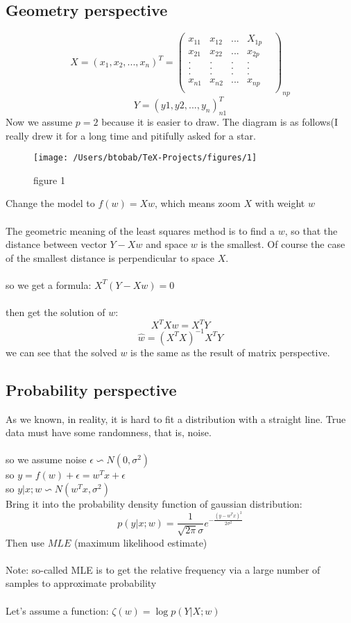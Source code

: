 \documentclass{report}
\begin{document}
\subsection{Geometry perspective}
$$
X=(x_1,x_2,...,x_n)^T=\begin{pmatrix}
x_{11}&x_{12}&...&X_{1p}\\
x_{21}&x_{22}&...&x_{2p}\\
.&.&.&.&\\
.&.&.&.&\\
.&.&.&.&\\
x_{n1}&x_{n2}&...&x_{np}\\
\end{pmatrix}_{np}
$$
$$
Y=(y1,y2,...,y_n)_{n1}^T
$$
Now we assume  $p=2$ because it is easier to draw. The diagram is as follows(I really drew it for a long time and pitifully asked for a star.
\begin{figure}
\texttt{[image: /Users/btobab/TeX-Projects/figures/1]}
\caption{figure 1}
\end{figure}
Change the model to $f(w)=Xw$, which means zoom $X$ with weight $w$\\\\
The geometric meaning of the least squares method is to find a $w$, so that the distance between vector $Y-Xw$ and space $w$ is the smallest. Of course the case of the smallest distance is perpendicular to space $X$.\\\\
so we get a formula: $X^T(Y-Xw)=0$\\\\
then get the solution of $w$: 
$$
X^TXw=X^TY
$$
$$
\hat{w}=(X^TX)^{-1}X^TY
$$
we can see that the solved $w$ is the same as the result of matrix perspective.
\subsection{Probability perspective}
As we known, in reality, it is hard to fit a distribution with a straight line. True data must have some randomness, that is, noise.\\\\
so we assume noise $\epsilon\backsim N(0,\sigma^2)$\\
so $y=f(w)+\epsilon=w^Tx+\epsilon$\\
so $y|x;w\backsim N(w^Tx,\sigma^2)$\\
Bring it into the probability density function of gaussian distribution:
$$
p(y|x;w)=\frac{1}{\sqrt{2\pi}\sigma}e^{-\frac{(y-w^Tx)^2}{2\sigma^2}}
$$
Then use $MLE$ (maximum likelihood estimate)\\\\
Note: so-called MLE is to get the relative frequency via a large number of samples to approximate probability\\\\
Let's assume a function: $\zeta(w)=\log{p(Y|X;w)}$
\end{document}
